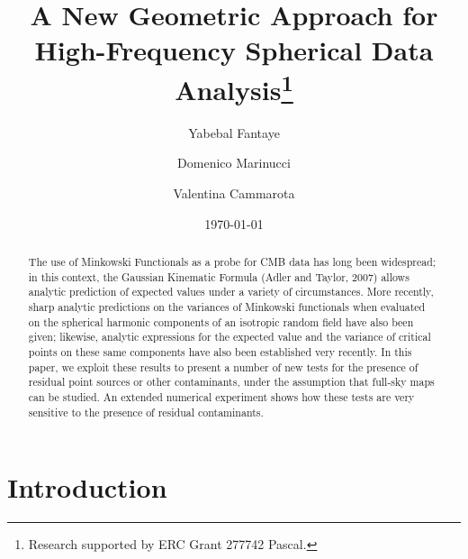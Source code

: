 \documentclass[aps,prd,showpacs,superscriptaddress,groupedaddress]{revtex4-1}  %
\begin{document}
\title{A New Geometric Approach for High-Frequency Spherical Data Analysis\thanks{%
Research supported by ERC Grant 277742 Pascal.}}
\author{Yabebal Fantaye}
\author{Domenico Marinucci}
\author{Valentina Cammarota}



\date{\today}



\begin{abstract}
The use of Minkowski Functionals as a probe for CMB data has long been widespread; in this context, the Gaussian Kinematic Formula (Adler and Taylor, 2007) allows analytic prediction of expected values under a variety of circumstances. More recently, sharp analytic predictions on the variances of Minkowski functionals when evaluated on the spherical harmonic components of an isotropic random field have also been given; likewise, analytic expressions for the expected value and the variance of critical points on these same components have also been established very recently. In this paper, we exploit these results to present a number of new tests for the presence of residual point sources or other contaminants, under the assumption that full-sky maps can be studied. An extended numerical experiment shows how these tests are very sensitive to the presence of residual contaminants.
\end{abstract}




\maketitle

\section{Introduction}
\end{document}
